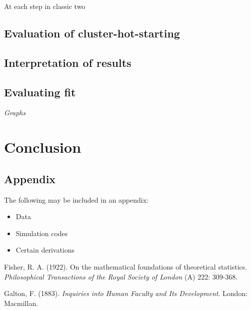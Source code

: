 \documentclass[12pt]{article}
\begin{document}
At each step in classic two 

\subsection{Evaluation of cluster-hot-starting} 
\subsection{Interpretation of results}
\subsection{Evaluating fit}



\emph{Graphs}

\section{Conclusion}\label{conclusion}







\newpage

\begin{appendix}
\section{Appendix}

\vspace{4mm}\noindent 
The following may be included in an appendix:

\begin{itemize}
\item[] Data 
\item[] Simulation codes
\item[] Certain derivations
\end{itemize}
\end{appendix}
\newpage

\begin{thebibliography}{99}

 Fisher, R. A. (1922). On the mathematical foundations of
theoretical statistics. {\it Philosophical Transactions of the Royal
Society of London} (A) 222: 309-368.

Galton, F. (1883). {\it Inquiries into Human Faculty and Its
Development}. London: Macmillan.

\end{thebibliography}
\end{document}
